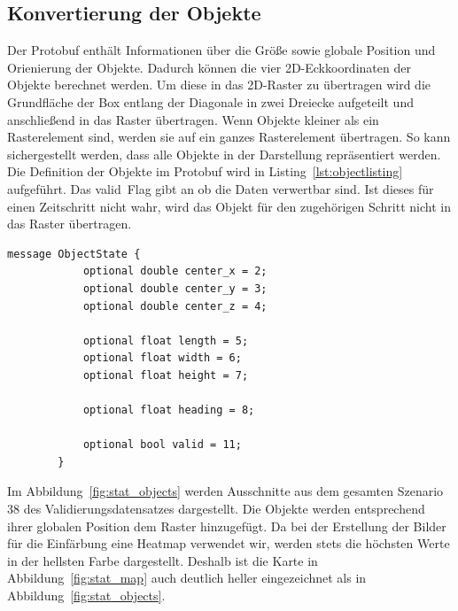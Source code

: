 \documentclass[12pt]{article}
\begin{document}
    \subsection{Konvertierung der Objekte}
        Der Protobuf enthält Informationen über die Größe sowie globale Position und Orienierung der Objekte. 
        Dadurch können die vier 2D-Eckkoordinaten der Objekte berechnet werden. Um diese in das 2D-Raster zu übertragen wird die Grundfläche der Box entlang der Diagonale in  
        zwei Dreiecke aufgeteilt und anschließend in das Raster übertragen. Wenn Objekte kleiner als ein Rasterelement sind, werden sie auf ein ganzes Rasterelement übertragen. 
        So kann sichergestellt werden, dass alle Objekte in der Darstellung repräsentiert werden.
        Die Definition der Objekte im Protobuf wird in Listing~\ref{lst:objectlisting} aufgeführt. 
        Das \grqq valid\grqq~Flag gibt an ob die Daten verwertbar sind. 
        Ist dieses für einen Zeitschritt nicht wahr, wird das Objekt für den zugehörigen Schritt nicht in das Raster übertragen.
        \vspace{0.5cm}
        \begin{lstlisting}[language=protobuf2, caption=Auszug aus scenario.proto, label={lst:objectlisting}]
        message ObjectState {
            optional double center_x = 2;
            optional double center_y = 3;
            optional double center_z = 4;
            
            optional float length = 5;
            optional float width = 6;
            optional float height = 7;
            
            optional float heading = 8;
            
            optional bool valid = 11;
        }
        \end{lstlisting}
        Im Abbildung~\ref{fig:stat_objects} werden Ausschnitte aus dem gesamten Szenario 38 des Validierungsdatensatzes dargestellt.
        Die Objekte werden entsprechend ihrer globalen Position dem Raster hinzugefügt.
        Da bei der Erstellung der Bilder für die Einfärbung eine Heatmap verwendet wir, werden stets die höchsten Werte in der hellsten Farbe dargestellt. 
        Deshalb ist die Karte in Abbildung~\ref{fig:stat_map} auch deutlich heller eingezeichnet als in Abbildung~\ref{fig:stat_objects}.
\end{document}
